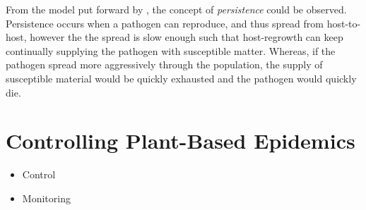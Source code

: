 From the model put forward by \cite{park2001invasion}, the concept of \textit{persistence} could be observed. Persistence occurs when a pathogen can reproduce, and thus spread from host-to-host, however the the spread is slow enough such that host-regrowth can keep continually supplying the pathogen with susceptible matter. Whereas, if the pathogen spread more aggressively through the population, the supply of susceptible material would be quickly exhausted and the pathogen would quickly die.




\section{Controlling Plant-Based Epidemics}
\label{ch2:control-review}

\begin{itemize}
    \item Control
    \item Monitoring
\end{itemize}



